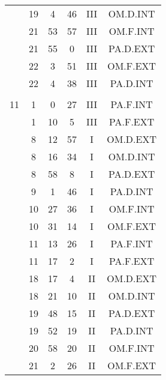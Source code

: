 \documentclass[12pt, a4paper]{article}
\begin{document}
\begin{multicols}{3}
{\begin{tabular}{c c c c c c}
	 	 	 	 & 19 & 4 & 46 & III & OM.D.INT\\%
	 	 	 	 & 21 & 53 & 57 & III & OM.F.INT\\%
	 	 	 	 & 21 & 55 & 0 & III & PA.D.EXT\\%
	 	 	 	 & 22 & 3 & 51 & III & OM.F.EXT\\%
	 	 	 	 & 22 & 4 & 38 & III & PA.D.INT\\%
	 	 	 	 & & & & & \\%
	 	 	 	11 & 1 & 0 & 27 & III & PA.F.INT\\%
	 	 	 	 & 1 & 10 & 5 & III & PA.F.EXT\\%
	 	 	 	 & 8 & 12 & 57 & I & OM.D.EXT\\%
	 	 	 	 & 8 & 16 & 34 & I & OM.D.INT\\%
	 	 	 	 & 8 & 58 & 8 & I & PA.D.EXT\\%
	 	 	 	 & 9 & 1 & 46 & I & PA.D.INT\\%
	 	 	 	 & 10 & 27 & 36 & I & OM.F.INT\\%
	 	 	 	 & 10 & 31 & 14 & I & OM.F.EXT\\%
	 	 	 	 & 11 & 13 & 26 & I & PA.F.INT\\%
	 	 	 	 & 11 & 17 & 2 & I & PA.F.EXT\\%
	 	 	 	 & 18 & 17 & 4 & II & OM.D.EXT\\%
	 	 	 	 & 18 & 21 & 10 & II & OM.D.INT\\%
	 	 	 	 & 19 & 48 & 15 & II & PA.D.EXT\\%
	 	 	 	 & 19 & 52 & 19 & II & PA.D.INT\\%
	 	 	 	 & 20 & 58 & 20 & II & OM.F.INT\\%
	 	 	 	 & 21 & 2 & 26 & II & OM.F.EXT\\%
	 	 \end{tabular}
 	}
\end{multicols}
\end{document}
